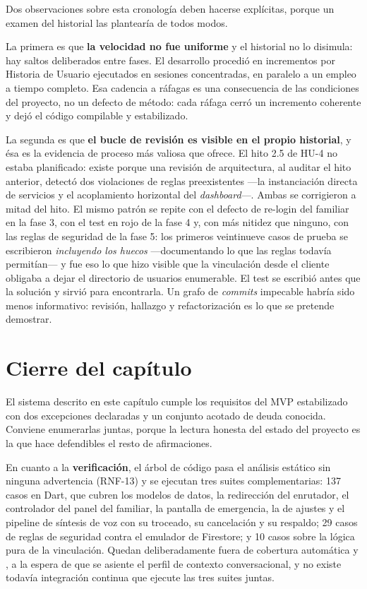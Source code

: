 Dos observaciones sobre esta cronología deben hacerse explícitas, porque un examen del historial las
plantearía de todos modos.

La primera es que \textbf{la velocidad no fue uniforme} y el historial no lo disimula: hay saltos
deliberados entre fases. El desarrollo procedió en incrementos por Historia de Usuario ejecutados en
sesiones concentradas, en paralelo a un empleo a tiempo completo. Esa cadencia a ráfagas es una consecuencia
de las condiciones del proyecto, no un defecto de método: cada ráfaga cerró un incremento coherente y dejó
el código compilable y estabilizado.

La segunda es que \textbf{el bucle de revisión es visible en el propio historial}, y ésa es la evidencia de
proceso más valiosa que ofrece. El hito 2.5 de HU-4 no estaba planificado: existe porque una revisión de
arquitectura, al auditar el hito anterior, detectó dos violaciones de reglas preexistentes ---la
instanciación directa de servicios y el acoplamiento horizontal del \emph{dashboard}---. Ambas se
corrigieron a mitad del hito. El mismo patrón se repite con el defecto de re-login del familiar en la fase 3,
con el test en rojo de la fase 4 y, con más nitidez que ninguno, con las reglas de seguridad de la fase 5:
los primeros veintinueve casos de prueba se escribieron \emph{incluyendo los huecos} ---documentando lo que
las reglas todavía permitían--- y fue eso lo que hizo visible que la vinculación desde el cliente obligaba a
dejar el directorio de usuarios enumerable. El test se escribió antes que la solución y sirvió para
encontrarla. Un grafo de \emph{commits} impecable habría sido menos informativo: revisión, hallazgo y
refactorización es lo que se pretende demostrar.

\section{Cierre del capítulo}

El sistema descrito en este capítulo cumple los requisitos del MVP estabilizado con dos excepciones
declaradas y un conjunto acotado de deuda conocida. Conviene enumerarlas juntas, porque la lectura honesta
del estado del proyecto es la que hace defendibles el resto de afirmaciones.

En cuanto a la \textbf{verificación}, el árbol de código pasa el análisis estático sin ninguna advertencia
(RNF-13) y se ejecutan tres suites complementarias: 137 casos en Dart, que cubren los modelos de datos, la
redirección del enrutador, el controlador del panel del familiar, la pantalla de emergencia, la de ajustes y
el pipeline de síntesis de voz con su troceado, su cancelación y su respaldo; 29 casos de reglas de
seguridad contra el emulador de Firestore; y 10 casos sobre la lógica pura de la vinculación. Quedan
deliberadamente fuera de cobertura automática  y , a la espera de
que se asiente el perfil de contexto conversacional, y no existe todavía integración continua que ejecute
las tres suites juntas.

